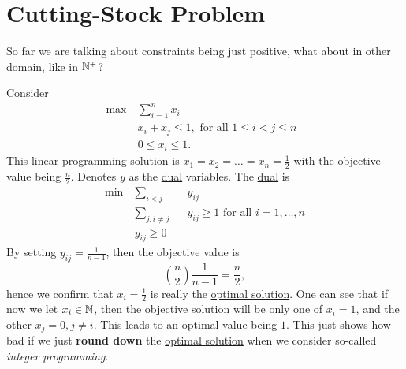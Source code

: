 \section{Cutting-Stock Problem}
So far we are talking about constraints being just positive, what about in other domain, like in \(\mathbb{\MakeUppercase{N}}^+\)?

Consider
\[
	\begin{aligned}
		\max~ & \sum\limits_{i=1}^{n} x_{i}                              \\
		      & x_{i}+x_{j}\leq 1, \text{ for all \(1\leq i< j\leq n\) } \\
		      & 0\leq x_{i}\leq 1.
	\end{aligned}
\]
This linear programming solution is \(x_1 = x_2 = \ldots  = x_n = \frac{1}{2}\) with the objective value being \(\frac{n}{2}\).
Denotes \(y\) as the \hyperref[def:dual]{dual} variables. The \hyperref[def:dual]{dual} is
\[
	\begin{alignedat}{3}
		\min~ & \sum\limits_{i<j}            && y_{ij}                                             \\
		& \sum\limits_{j\colon i\neq j} && y_{ij}\geq 1 \text{ for all \(i = 1, \ldots , n\)} \\
		& y_{ij}\geq 0
	\end{alignedat}
\]
By setting \(y_{ij} = \frac{1}{n-1}\), then the objective value is
\[
	\binom{n}{2}\frac{1}{n-1} = \frac{n}{2},
\]
hence we confirm that \(x_{i} = \frac{1}{2}\) is really the \hyperref[def:optimal-solution]{optimal solution}. One can see that if now we let \(x_{i}\in\mathbb{\MakeUppercase{N}}\), then
the objective solution will be only one of \(x_{i} = 1\), and the other \(x_{j} = 0, j\neq i\). This leads to an \hyperref[def:optimal-solution]{optimal} value being
\(1\). This just shows how bad if we just \textbf{round down} the \hyperref[def:optimal-solution]{optimal solution} when we consider so-called \emph{integer programming}.